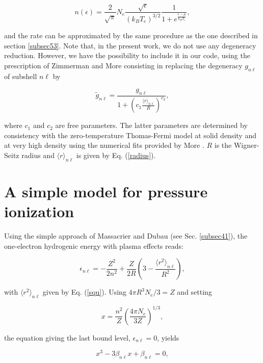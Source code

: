 \documentclass[a4paper,10pt]{article}
\begin{document}
\begin{equation}
n(\epsilon)=\frac{2}{\sqrt{\pi}}N_e\frac{\sqrt{\epsilon}}{\left(k_BT_e\right)^{3/2}}\frac{1}{1+e^{\frac{\epsilon-\mu}{k_BT_e}}},
\end{equation}

\noindent and the rate can be approximated by the same procedure as the one described in section \ref{subsec53}.
Note that, in the present work, we do not use any degeneracy reduction. However, we have the possibility to include it in our code, using the prescription of Zimmerman and More \cite{zimmerman80} consisting in replacing the degeneracy $g_{n\ell}$ of subshell $n\ell$ by

\begin{equation}
\tilde{g}_{n\ell}=\frac{g_{n\ell}}{1+\left(c_1\frac{\langle r\rangle_{n\ell}}{R}\right)^{c_2}},
\end{equation}

\noindent where $c_1$ and $c_2$ are free parameters. The latter parameters are determined by consistency with the zero-temperature Thomas-Fermi model at solid density and at very high density using the numerical fits provided by More \cite{more85}. $R$ is the Wigner-Seitz radius and $\langle r\rangle_{n\ell}$ is given by Eq. (\ref{radius}).

\section{A simple model for pressure ionization}\label{sec6}

Using the simple approach of Massacrier and Dubau (see Sec. \ref{subsec41}), the one-electron hydrogenic energy with plasma effects reads:

\begin{equation*}
\epsilon_{n\ell}=-\frac{Z^2}{2n^2}+\frac{Z}{2R}\left(3-\frac{\langle r^2\rangle_{n\ell}}{R^2}\right),
\end{equation*}

\noindent with $\langle r^2\rangle_{n\ell}$ given by Eq. (\ref{squ}). Using $4\pi R^3N_e/3=Z$ and setting

\begin{equation*}
x=\frac{n^2}{Z}\left(\frac{4\pi N_e}{3Z}\right)^{1/3},
\end{equation*}

\noindent the equation giving the last bound level, $\epsilon_{n\ell}=0$, yields

\begin{equation*}
x^3-3\beta_{n\ell}x+\beta_{n\ell}=0,
\end{equation*}
\end{document}
